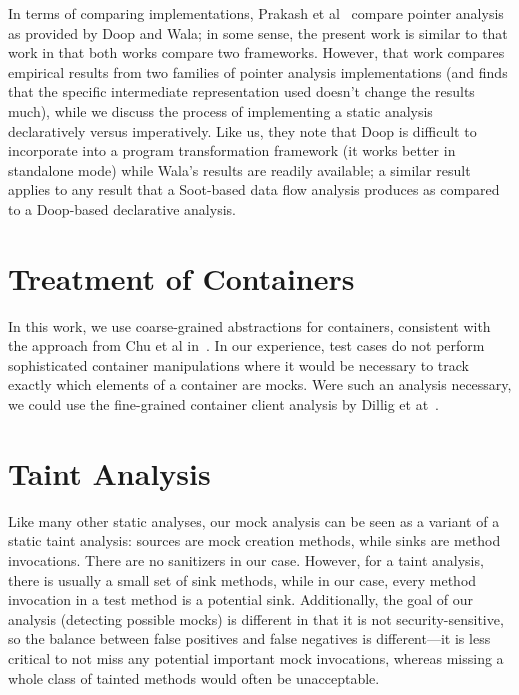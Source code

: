 
In terms of comparing implementations, Prakash et al~\cite{prakash21:_effec_progr_repres_point_analy} compare pointer analysis as provided by Doop and Wala; in some sense, the present work is similar to that work in that both works compare two frameworks. However, that work compares empirical results from two families of pointer analysis implementations (and finds that the specific intermediate representation used doesn't change the results much), while we discuss the process of implementing a static analysis declaratively versus imperatively. Like us, they note that Doop is difficult to incorporate into a program transformation framework (it works better in standalone mode) while Wala's results are readily available; a similar result applies to any result that a Soot-based data flow analysis produces as compared to a Doop-based declarative analysis.

\section{Treatment of Containers}

In this work, we use coarse-grained abstractions for containers, consistent with the approach from Chu et al in~\cite{chu12:_collec_disjoin_analy}. In our experience, test cases do not perform sophisticated container manipulations where it would be necessary to track exactly which elements of a container are mocks. Were such an analysis necessary, we could use the fine-grained container client analysis by Dillig et at~\cite{dillig11:_precis_reason_progr_using_contain}.

\section{Taint Analysis}

Like many other static analyses, our mock analysis can be seen as a variant of a static taint analysis: sources are mock creation methods, while sinks are method invocations. There are no sanitizers in our case. However, for a taint analysis, there is usually a small set of sink methods, while in our case, every method invocation in a test method is a potential sink. Additionally, the goal of our analysis (detecting possible mocks) is different in that it is not security-sensitive, so the balance between false positives and false negatives is different---it is less critical to not miss any potential important mock invocations, whereas missing a whole class of tainted methods would often be unacceptable.
